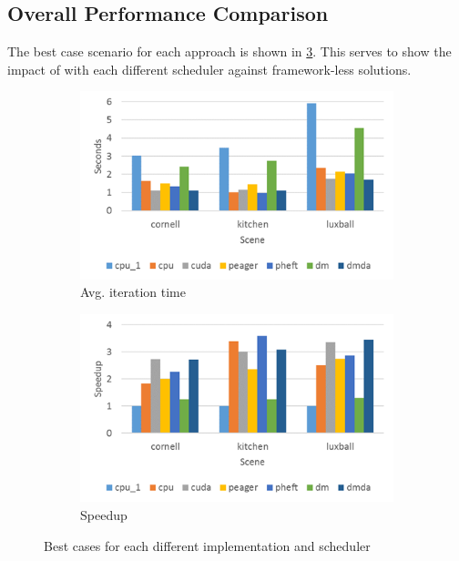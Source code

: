 \documentclass[main.tex]{subfiles}
\begin{document}
\subsection{Overall Performance Comparison}

The best case scenario for each approach is shown in \cref{fig:prof:overall}. This serves to show the impact of \starpu with each different scheduler against framework-less solutions.

\begin{figure}[!htp]
  \centering
  \begin{subfigure}{.5\textwidth}
    \centering
    \includegraphics[width=\linewidth]{profiling/1iter_time}
    \caption{Avg. iteration time \label{fig:prof:overall_time}}
  \end{subfigure}%
  \begin{subfigure}{.5\textwidth}
    \centering
    \includegraphics[width=\linewidth]{profiling/1iter_speedup}
    \caption{Speedup \label{fig:prof:overall_speedup}}
  \end{subfigure}
  \caption{Best cases for each different implementation and scheduler \label{fig:prof:overall}}
\end{figure}
\end{document}
